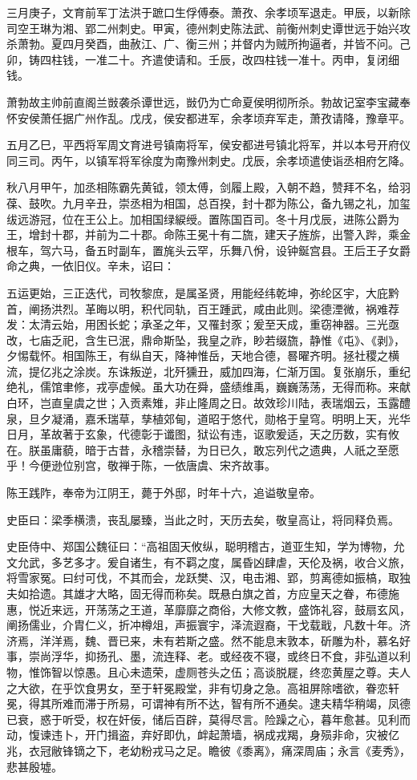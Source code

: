 \documentclass[12pt,UTF8]{ctexbook}
\begin{document}
三月庚子，文育前军丁法洪于蹠口生俘傅泰。萧孜、余孝顷军退走。甲辰，以新除司空王琳为湘、郢二州刺史。甲寅，德州刺史陈法武、前衡州刺史谭世远于始兴攻杀萧勃。夏四月癸酉，曲赦江、广、衡三州；并督内为贼所拘逼者，并皆不问。己卯，铸四柱钱，一准二十。齐遣使请和。壬辰，改四柱钱一准十。丙申，复闭细钱。

萧勃故主帅前直阁兰敱袭杀谭世远，敱仍为亡命夏侯明彻所杀。勃故记室李宝藏奉怀安侯萧任据广州作乱。戊戌，侯安都进军，余孝顷弃军走，萧孜请降，豫章平。

五月乙巳，平西将军周文育进号镇南将军，侯安都进号镇北将军，并以本号开府仪同三司。丙午，以镇军将军徐度为南豫州刺史。戊辰，余孝顷遣使诣丞相府乞降。

秋八月甲午，加丞相陈霸先黄钺，领太傅，剑履上殿，入朝不趋，赞拜不名，给羽葆、鼓吹。九月辛丑，崇丞相为相国，总百揆，封十郡为陈公，备九锡之礼，加玺绂远游冠，位在王公上。加相国绿綟绶。置陈国百司。冬十月戊辰，进陈公爵为王，增封十郡，并前为二十郡。命陈王冕十有二旒，建天子旌旂，出警入跸，乘金根车，驾六马，备五时副车，置旄头云罕，乐舞八佾，设钟鋋宫县。王后王子女爵命之典，一依旧仪。辛未，诏曰：

五运更始，三正迭代，司牧黎庶，是属圣贤，用能经纬乾坤，弥纶区宇，大庇黔首，阐扬洪烈。革晦以明，积代同轨，百王踵武，咸由此则。梁德湮微，祸难荐发：太清云始，用困长蛇；承圣之年，又罹封豕；爰至天成，重窃神器。三光亟改，七庙乏祀，含生已泯，鼎命斯坠，我皇之祚，眇若缀旒，静惟《屯》、《剥》，夕惕载怀。相国陈王，有纵自天，降神惟岳，天地合德，晷曜齐明。拯社稷之横流，提亿兆之涂炭。东诛叛逆，北歼獯丑，威加四海，仁渐万国。复张崩乐，重纪绝礼，儒馆聿修，戎亭虚候。虽大功在舜，盛绩维禹，巍巍荡荡，无得而称。来献白环，岂直皇虞之世；入贡素雉，非止隆周之日。故效珍川陆，表瑞烟云，玉露醴泉，旦夕凝涌，嘉禾瑞草，孳植郊甸，道昭于悠代，勋格于皇穹。明明上天，光华日月，革故著于玄象，代德彰于谶图，狱讼有违，讴歌爰适，天之历数，实有攸在。朕虽庸藐，暗于古昔，永稽崇替，为日已久，敢忘列代之遗典，人祇之至愿乎！今便逊位别宫，敬禅于陈，一依唐虞、宋齐故事。

陈王践阼，奉帝为江阴王，薨于外邸，时年十六，追谥敬皇帝。

史臣曰：梁季横溃，丧乱屡臻，当此之时，天历去矣，敬皇高让，将同释负焉。

史臣侍中、郑国公魏征曰：“高祖固天攸纵，聪明稽古，道亚生知，学为博物，允文允武，多艺多才。爰自诸生，有不羁之度，属昏凶肆虐，天伦及祸，收合义旅，将雪家冤。曰纣可伐，不其而会，龙跃樊、汉，电击湘、郢，剪离德如振槁，取独夫如拾遗。其雄才大略，固无得而称矣。既悬白旗之首，方应皇天之眷，布德施惠，悦近来远，开荡荡之王道，革靡靡之商俗，大修文教，盛饰礼容，鼓扇玄风，阐扬儒业，介胄仁义，折冲樽俎，声振寰宇，泽流遐裔，干戈载戢，凡数十年。济济焉，洋洋焉，魏、晋已来，未有若斯之盛。然不能息末敦本，斫雕为朴，慕名好事，崇尚浮华，抑扬孔、墨，流连释、老。或经夜不寝，或终日不食，非弘道以利物，惟饰智以惊愚。且心未遗荣，虚厕苍头之伍；高谈脱屣，终恋黄屋之尊。夫人之大欲，在乎饮食男女，至于轩冕殿堂，非有切身之急。高祖屏除嗜欲，眷恋轩冕，得其所难而滞于所易，可谓神有所不达，智有所不通矣。逮夫精华稍竭，凤德已衰，惑于听受，权在奸佞，储后百辟，莫得尽言。险躁之心，暮年愈甚。见利而动，愎谏违卜，开门揖盗，弃好即仇，衅起萧墙，祸成戎羯，身殒非命，灾被亿兆，衣冠敝锋镝之下，老幼粉戎马之足。瞻彼《黍离》，痛深周庙；永言《麦秀》，悲甚殷墟。
\end{document}
